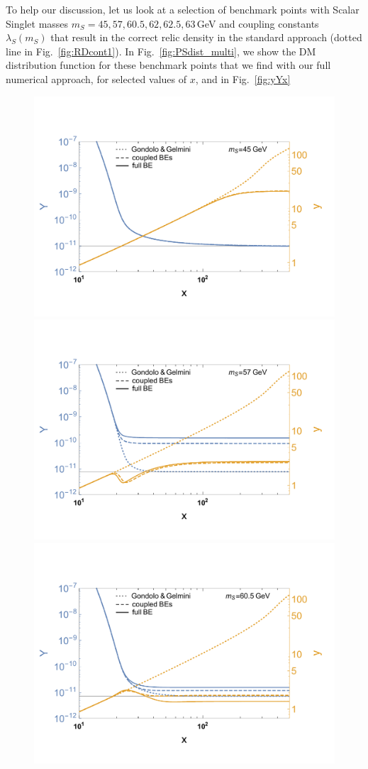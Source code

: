 \documentclass[twocolumn,showpacs,amsmath,amssymb,superscriptaddress,nofootinbib]{revtex4-1}
\begin{document}
To help our discussion, let us look at a selection of benchmark points with Scalar Singlet masses
$m_S=45,57,60.5, 62,62.5,63$\,GeV and coupling constants $\lambda_S(m_S)$ that 
result in the correct relic density in the standard approach (dotted line in Fig.~\ref{fig:RDcont1}).
In Fig.~\ref{fig:PSdist_multi}, 
we show the DM distribution function for these benchmark points
that we find with our full numerical  approach, for selected values of $x$, and in Fig.~\ref{fig:yYx} 
\begin{figure}
  \includegraphics[trim={1cm 1cm 1cm 1cm}, width=0.65\columnwidth]{Yyx_mDM45}
  \hspace{0.3cm}
  \includegraphics[trim={1cm 1cm 1cm 1cm}, width=0.65\columnwidth]{Yyx_mDM57}
  \hspace{0.3cm}
  \includegraphics[trim={1cm 1cm 1cm 1cm}, width=0.65\columnwidth]{Yyx_mDM60_5}\\

\end{figure}
\end{document}
